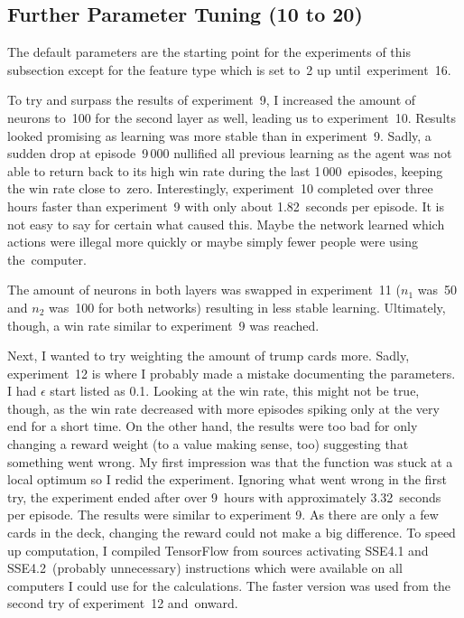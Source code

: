 \documentclass[a4paper,titlepage]{article}
\begin{document}
\subsection{Further Parameter Tuning (10 to 20)}

The default parameters are the starting point for the experiments of this subsection except for the feature type which is set to~2 up until~experiment~16.

To try and surpass the results of experiment~9, I increased the amount of neurons to~100 for the second layer as well, leading us to experiment~10. Results looked promising as learning was more stable than in experiment~9. Sadly, a sudden drop at episode~9\,000 nullified all previous learning as the agent was not able to return back to its high win rate during the last 1\,000~episodes, keeping the win rate close to~zero. Interestingly, experiment~10 completed over three hours faster than experiment~9 with only about 1.82~seconds per episode. It is not easy to say for certain what caused this. Maybe the network learned which actions were illegal more quickly or maybe simply fewer people were using the~computer.

The amount of neurons in both layers was swapped in experiment~11  ($n_1$ was~50 and $n_2$ was~100 for both networks) resulting in less stable learning. Ultimately, though, a win rate similar to experiment~9 was reached.

Next, I wanted to try weighting the amount of trump cards more. Sadly, experiment~12 is where I probably made a mistake documenting the parameters. I had $\epsilon$ start listed as 0.1. Looking at the win rate, this might not be true, though, as the win rate decreased with more episodes spiking only at the very end for a short time. On the other hand, the results were too bad for only changing a reward weight (to a value making sense, too) suggesting that something went wrong. My first impression was that the function was stuck at a local optimum so I redid the experiment. Ignoring what went wrong in the first try, the experiment ended after over 9~hours with approximately 3.32~seconds per episode. The results were similar to experiment 9. As there are only a few cards in the deck, changing the reward could not make a big difference. To speed up computation, I compiled TensorFlow from sources activating SSE4.1 and SSE4.2~(probably unnecessary) instructions which were available on all computers I could use for the calculations. The faster version was used from the second try of experiment~12 and~onward.
\end{document}
